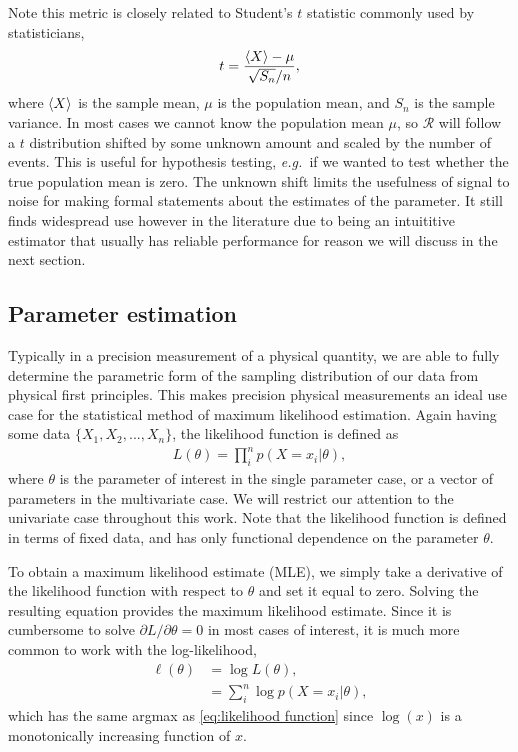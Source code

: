 Note this metric is closely related to Student's $t$ statistic commonly used by statisticians,
\begin{align}
  t = \frac{\left\langle X \right\rangle - \mu}{\sqrt{S_n}/n},
\end{align}
where $\left\langle X \right\rangle$ is the sample mean, $\mu$ is the population mean, and $S_n$ is the sample variance.  In most cases we cannot know the population mean $\mu$, so $\mathcal{R}$ will follow a $t$ distribution shifted by some unknown amount and scaled by the number of events.  This is useful for hypothesis testing, \emph{e.g.~}if we wanted to test whether the true population mean is zero.  The unknown shift limits the usefulness of signal to noise for making formal statements about the estimates of the parameter.  It still finds widespread use however in the literature due to being an intuititive estimator that usually has reliable performance for reason we will discuss in the next section.  

\subsection{Parameter estimation}
Typically in a precision measurement of a physical quantity, we are able to fully determine the parametric form of the sampling distribution of our data from physical first principles.  This makes precision physical measurements an ideal use case for the statistical method of maximum likelihood estimation.  Again having some data $\{X_1, X_2,..., X_n\}$, the likelihood function is defined as
\begin{align}\label{eq:likelihood function}
  L(\theta) = \prod^n_i p(X=x_i|\theta),
\end{align}
where $\theta$ is the parameter of interest in the single parameter case, or a vector of parameters in the multivariate case.  We will restrict our attention to the univariate case throughout this work.  Note that the likelihood function is defined in terms of fixed data, and has only functional dependence on the parameter $\theta$.

To obtain a maximum likelihood estimate (MLE), we simply take a derivative of the likelihood function with respect to $\theta$ and set it equal to zero.  Solving the resulting equation provides the maximum likelihood estimate.  Since it is cumbersome to solve $\partial L/ \partial \theta = 0$ in most cases of interest, it is much more common to work with the log-likelihood,
\begin{align}
\nonumber  \ell(\theta) &= \log L(\theta), \\
                        &=  \sum^n_i  \log p(X=x_i|\theta),
\end{align}
which has the same argmax as \eqref{eq:likelihood function} since $\log(x)$ is a monotonically increasing function of $x$.

